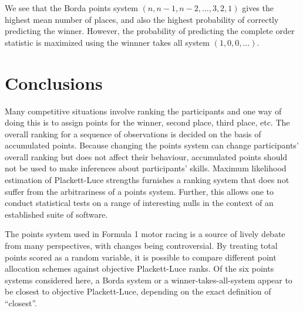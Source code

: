 \documentclass[a4,12pt]{article}
\begin{document}
We see that the Borda points system $(n,n-1,n-2,\ldots,3,2,1)$ gives
the highest mean number of places, and also the highest probability of
correctly predicting the winner.  However, the probability of predicting
the complete order statistic is maximized using the winnner takes all
system \((1,0,0,\ldots)\).

\section{\centering Conclusions}

Many competitive situations involve ranking the participants and one
way of doing this is to assign points for the winner, second place,
third place, etc.  The overall ranking for a sequence of observations
is decided on the basis of accumulated points.  Because changing the
points system can change participants' overall ranking but does not
affect their behaviour, accumulated points should not be used to make
inferences about participants' skills.  Maximum likelihood estimation
of Plackett-Luce strengths furnishes a ranking system that does not
suffer from the arbitrariness of a points system.  Further, this
allows one to conduct statistical tests on a range of interesting
nulls in the context of an established suite of software.

The points system used in Formula 1 motor racing is a source of lively
debate from many perspectives, with changes being controversial.  By
treating total points scored as a random variable, it is possible to
compare different point allocation schemes against objective
Plackett-Luce ranks.  Of the six points systems considered here, a
Borda system or a winner-takes-all-system appear to be closest to
objective Plackett-Luce, depending on the exact definition of
``closest''.





\end{document}
